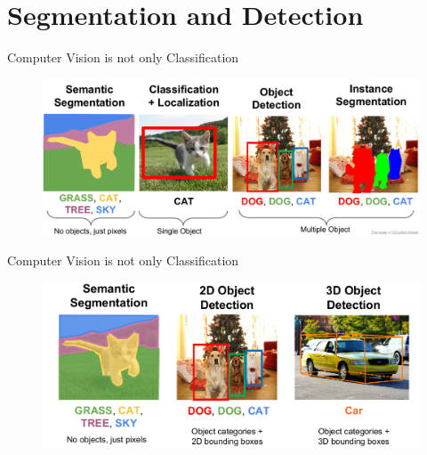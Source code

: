 \documentclass[aspectratio=169]{beamer}
\begin{document}
\section{Segmentation and Detection}
\begin{frame}{Computer Vision is not only Classification}
\begin{figure}
    \centering
    \includegraphics[scale=0.35]{demo/figs/cvtask.png}
\end{figure}
\end{frame}

\begin{frame}{Computer Vision is not only Classification}
\begin{figure}
    \centering
    \includegraphics[scale=0.35]{demo/figs/cvtask2.png}
\end{figure}
\end{frame}
\end{document}
